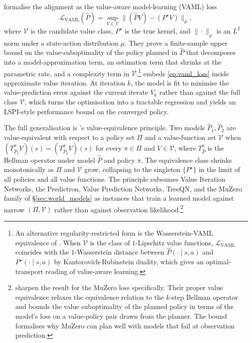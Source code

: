 \citet{FarahmandVAML2017} formalise the alignment as the value-aware
model-learning (VAML) loss
\begin{equation}
\mathcal L_{\mathrm{VAML}}(\widehat P)
= \sup_{V \in \mathcal V} \bigl\| (\widehat P V) - (P^\star V) \bigr\|_\mu,
\label{eq:vaml_loss}
\end{equation}
where $\mathcal V$ is the candidate value class, $P^\star$ is the true
kernel, and $\| \cdot \|_\mu$ is an $L^2$ norm under a state-action
distribution $\mu$. They prove a finite-sample upper bound on the
value-suboptimality of the policy planned in $\widehat P$ that decomposes
into a model-approximation term, an estimation term that shrinks at the
parametric rate, and a complexity term in
$\mathcal V$.\footnote{An alternative regularity-restricted form is the
Wasserstein-VAML equivalence of \citet{AsadiWasserstein2018}. When
$\mathcal V$ is the class of $1$-Lipschitz value functions,
$\mathcal L_{\mathrm{VAML}}$ coincides with the $1$-Wasserstein distance
between $\widehat P(\cdot \mid s, a)$ and $P^\star(\cdot \mid s, a)$ by
Kantorovich-Rubinstein duality, which gives an optimal-transport reading
of value-aware learning.} \citet{FarahmandIterVAML2018} embeds
\eqref{eq:vaml_loss} inside approximate value iteration. At iteration $k$,
the model is fit to minimise the value-prediction error against the
current iterate $V_k$ rather than against the full class $\mathcal V$,
which turns the optimisation into a tractable regression and yields an
LSPI-style performance bound on the converged policy.

The full generalisation is \citet{GrimmVALEQ2020}'s value-equivalence
principle. Two models $\widehat P_1, \widehat P_2$ are value-equivalent
with respect to a policy set $\Pi$ and a value-function set $\mathcal V$
when $(T_{\widehat P_1}^\pi V)(s) = (T_{\widehat P_2}^\pi V)(s)$ for every
$\pi \in \Pi$ and $V \in \mathcal V$, where $T_{\widehat P}^\pi$ is the
Bellman operator under model $\widehat P$ and policy $\pi$. The
equivalence class shrinks monotonically as $\Pi$ and $\mathcal V$ grow,
collapsing to the singleton $\{P^\star\}$ in the limit of all policies and
all value functions. The principle subsumes Value Iteration Networks, the
Predictron, Value Prediction Networks, TreeQN, and the MuZero family of
\S\ref{sec:world_models} as instances that train a learned model against
narrow $(\Pi, \mathcal V)$ rather than against observation
likelihood.\footnote{\citet{GrimmPVE2021} sharpen the result for the
MuZero loss specifically. Their proper value equivalence relaxes the
equivalence relation to the $k$-step Bellman operator and bounds the
value suboptimality of the planned policy in terms of the model's loss on
a value-policy pair drawn from the planner. The bound formalises why
MuZero can plan well with models that fail at observation prediction.}


